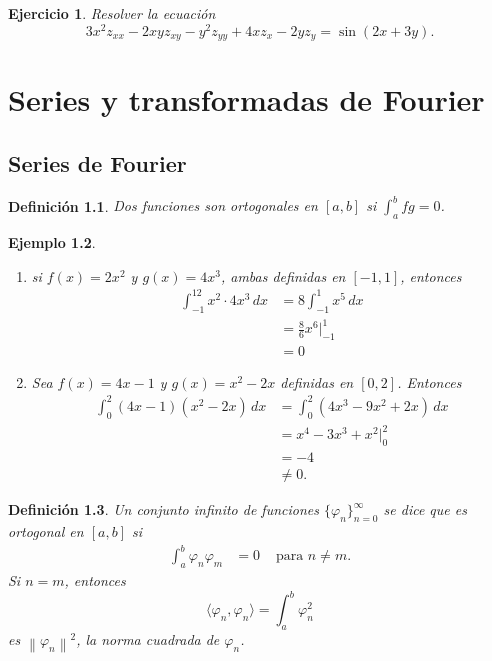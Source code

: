 \documentclass[11pt,letterpaper,draft]{report}
\newtheorem{defn}{Definición}[chapter]
\newtheorem{example}[defn]{Ejemplo}
\newtheorem{exe}[defn]{Ejercicio}
\newcommand\norm[1]{\left\|#1\right\|}
\newcommand\<{\langle}
\renewcommand\>{\rangle}
\renewcommand\phi\varphi
\begin{document}
\begin{exe}
  Resolver la ecuación
  \[
  3x^2 z_{xx} - 2xy z_{xy} - y^2 z_{yy} + 4x z_x - 2y z_y =
  \sin(2x+3y).
  \] 
\end{exe}

\chapter{Series y transformadas de Fourier}

\section{Series de Fourier}

\begin{defn}
  Dos funciones son ortogonales en $[a,b]$ si $\int_a^bfg=0$.
\end{defn}
\begin{example}
  \begin{enumerate}
    \item si $f(x)=2x^2$ y $g(x)=4x^3$, ambas definidas en
    $[-1,1]$, entonces
    \begin{align*}
      \int_{-1}^12x^2\cdot 4x^3\,dx
      &= 8\int_{-1}^1x^5\,dx \\
      &= \frac{8}{6}x^6|_{-1}^1 \\
      &= 0
    \end{align*}
    \item Sea $f(x)=4x-1$ y $g(x)=x^2-2x$ definidas en $[0,2]$.
    Entonces
    \begin{align*}
      \int_0^2(4x-1)(x^2-2x)\,dx
      &= \int_0^2(4x^3-9x^2+2x)\,dx \\
      &= x^4-3x^3+x^2 |_0^2 \\
      &= -4 \\
      &\neq 0.
    \end{align*}
  \end{enumerate}
\end{example}

\begin{defn}
  Un conjunto infinito de funciones $\{\phi_n\}_{n=0}^\infty$ se
  dice que es ortogonal en $[a,b]$ si
  \begin{align*}
    \int_a^b\phi_n\phi_m &= 0 & \text{ para } n\neq m.
  \end{align*}
  Si $n=m$, entonces
  \[
    \<\phi_n,\phi_n\> = \int_a^b \phi_n^2
  \]
  es $\norm{\phi_n}^{2}$, la norma cuadrada de $\phi_n$.
\end{defn}
\end{document}
